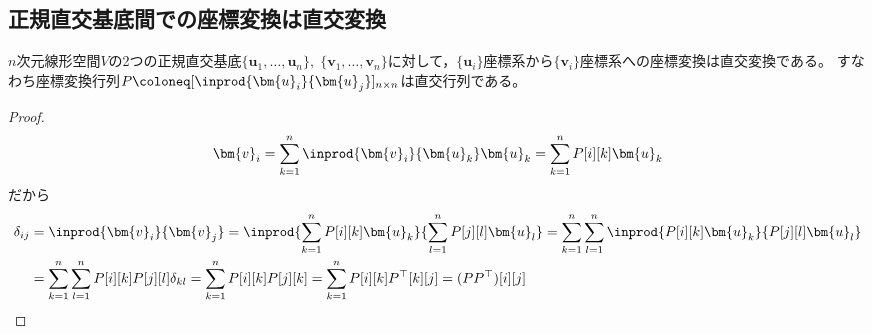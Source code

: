     \subsection{正規直交基底間での座標変換は直交変換}
        \begin{shadebox}
            $n$次元線形空間$V$の2つの正規直交基底$\{\bm{u}_1,\dots,\bm{u}_n\},\;\{\bm{v}_1,\dotsc,\bm{v}_n\}$に対して，$\{\bm{u}_i\}$座標系から$\{\bm{v}_i\}$座標系への座標変換は直交変換である。
            すなわち座標変換行列$P \coloneq [\inprod{\bm{u}_i}{\bm{u}_j}]_{n\times n}$は直交行列である。
        \end{shadebox}
        \begin{proof}
            \[ \bm{v}_i = \sum_{k=1}^n \inprod{\bm{v}_i}{\bm{u}_k}\bm{u}_k = \sum_{k=1}^n P[i][k]\bm{u}_k \]
            だから
            \begin{align*}
                \delta_{ij} &= \inprod{\bm{v}_i}{\bm{v}_j} = \inprod{\sum_{k=1}^n P[i][k]\bm{u}_k}{\sum_{l=1}^n P[j][l]\bm{u}_l} = \sum_{k=1}^n\sum_{l=1}^n \inprod{P[i][k]\bm{u}_k}{P[j][l]\bm{u}_l}\\
                &= \sum_{k=1}^n\sum_{l=1}^n P[i][k]P[j][l]\delta_{kl} = \sum_{k=1}^n P[i][k]P[j][k] = \sum_{k=1}^n P[i][k]P^\top[k][j] = (PP^\top)[i][j]
            \end{align*}
        \end{proof}